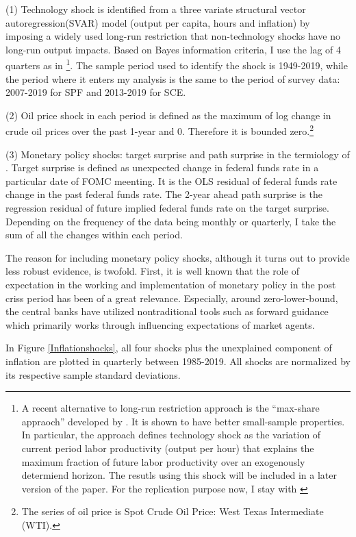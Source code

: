 \documentclass[]{article}
\begin{document}
(1) Technology shock is identified from a three variate structural vector autoregression(SVAR) model  (output per capita, hours and inflation) by imposing a widely used long-run restriction that non-technology shocks have no long-run output impacts. Based on Bayes information criteria, I use the lag of 4 quarters as in \citet{coibion2012can} \footnote{A recent alternative to long-run restriction approach is the ``max-share appraoch'' developed by \citet{francis2014flexible}. It is shown to have better small-sample properties. In particular,  the approach defines technology shock as the variation of current period labor productivity (output per hour) that explains the maximum fraction of future labor productivity over an exogenously determiend horizon. The resutls using this shock will be included in a later version of the paper. For the replication purpose now, I stay with \citet{gali1999technology}}. The sample period used to identify the shock is 1949-2019, while the period where it enters my analysis is the same to the period of survey data: 2007-2019 for SPF and 2013-2019 for SCE. 

(2) Oil price shock in each period is defined as the maximum of log change in crude oil prices over the past 1-year and 0. Therefore it is bounded zero.\footnote{The series of oil price is Spot Crude Oil Price: West Texas Intermediate (WTI).}

(3) Monetary policy shocks: target surprise and path surprise in the termiology of \citet{laseen2011anticipated}. Target surprise is defined as unexpected change in federal funds rate in a particular date of FOMC meenting. It is the OLS residual of federal funds rate change in the past federal funds rate. The 2-year ahead path surprise is the regression residual of future implied federal funds rate on the target surprise. Depending on the frequency of the data being monthly or quarterly, I take the sum of all the changes within each period.   

The reason for including monetary policy shocks, although it turns out to provide less robust evidence, is twofold. First, it is well known that the role of expectation in the working and implementation of monetary policy in the post criss period has been of a great relevance. Especially, around zero-lower-bound, the central banks have utilized nontraditional tools such as forward guidance which primarily works through influencing expectations of market agents. 

In Figure \ref{Inflationshocks}, all four shocks plus the unexplained component of inflation are plotted in quarterly between 1985-2019. All shocks are normalized by its respective sample standard deviations. 
\end{document}
